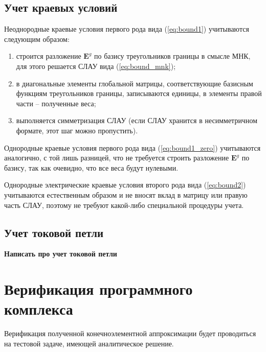 \documentclass[a4paper,14pt]{article}
\begin{document}

\subsection{Учет краевых условий}

Неоднородные краевые условия первого рода вида (\ref{eq:bound1}) учитываются следующим образом:
\begin{enumerate}
	\item строится разложение $\mathbf{E}^g$ по базису треугольников границы в смысле МНК, для этого решается СЛАУ вида (\ref{eq:bound_mnk});
	\item в диагональные элементы глобальной матрицы, соответствующие базисным функциям треугольников границы, записываются единицы, в элементы правой части -- полученные веса;
	\item выполняется симметризация СЛАУ (если СЛАУ хранится в несимметричном формате, этот шаг можно пропустить).
\end{enumerate}

Однородные краевые условия первого рода вида (\ref{eq:bound1_zero}) учитываются аналогично, с той лишь разницей, что не требуется строить разложение $\mathbf{E}^g$ по базису, так как очевидно, что все веса будут нулевыми.

Однородные электрические краевые условия второго рода вида (\ref{eq:bound2}) учитываются естественным образом и не вносят вклад в матрицу или правую часть СЛАУ, поэтому не требуют какой-либо специальной процедуры учета.


\subsection{Учет токовой петли}
{\color{red}\textbf{Написать про учет токовой петли}}


\clearpage
\section{Верификация программного комплекса}
Верификация полученной конечноэлементной аппроксимации будет проводиться на тестовой задаче, имеющей аналитическое решение.
\end{document}
